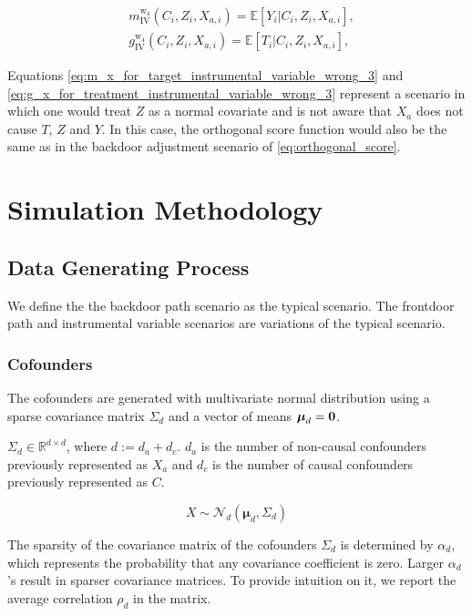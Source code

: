 \documentclass{article}
\numberwithin{equation}{section}
\begin{document}
\begin{align}
    & m_{\text{IV}}^{\text{w}_4}(C_i, Z_i, X_{a, i}) = \mathbb{E}[Y_i | C_i, Z_i, X_{a, i}],
    \label{eq:m_x_for_target_instrumental_variable_wrong_3}
    \\
    & g_{\text{IV}}^{\text{w}_4}(C_i, Z_i, X_{a, i}) = \mathbb{E}[T_i | C_i, Z_i, X_{a, i}],
    \label{eq:g_x_for_treatment_instrumental_variable_wrong_3}
\end{align}

Equations \eqref{eq:m_x_for_target_instrumental_variable_wrong_3} and \eqref{eq:g_x_for_treatment_instrumental_variable_wrong_3} represent a scenario in which one would treat $Z$ as a normal covariate and is not aware that $X_a$ does not cause $T$, $Z$ and $Y$. In this case, the orthogonal score function would also be the same as in the backdoor adjustment scenario of \eqref{eq:orthogonal_score}.

\section{Simulation Methodology}

\subsection{Data Generating Process}

We define the the backdoor path scenario as the typical scenario. The frontdoor path and instrumental variable scenarios are variations of the typical scenario.

\subsubsection{Cofounders}

The cofounders are generated with multivariate normal distribution using a sparse covariance matrix $\Sigma_d$ and a vector of means $\boldsymbol{\mu}_d = \bf{0}$.

$\Sigma_d \in \mathbb{R}^{d \times d}$, where $d := d_a + d_c$. $d_a$ is the number of non-causal confounders previously represented as $X_a$ and $d_c$ is the number of causal confounders previously represented as $C$.

\begin{equation}
    \label{eq:cofounders_data_generating_process}
    X \sim \mathcal{N}_d(\boldsymbol{\mu}_d, \Sigma_d)
\end{equation}

The sparsity of the covariance matrix of the cofounders $\Sigma_d$ is determined by $\alpha_d$, which represents the probability that any covariance coefficient is zero. Larger $\alpha_d$'s result in sparser covariance matrices. To provide intuition on it, we report the average correlation ${\rho_d}$ in the matrix.
\end{document}

